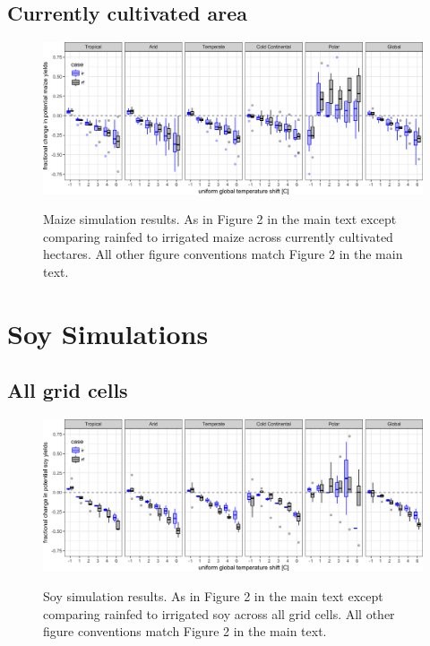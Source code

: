\documentclass[10pt]{article}
\begin{document}
\subsection{Currently cultivated area}
\begin{figure}[h!]
\includegraphics[width=\textwidth]{s_maize_sim_CG_area_weight.png}\\
\caption{Maize simulation results. As in Figure 2 in the main text except comparing rainfed to irrigated maize across currently cultivated hectares. All other figure conventions match Figure 2 in the main text.}
\label{fig:maizeCG}
\end{figure}

\clearpage
\section{Soy Simulations}
\subsection{All grid cells}
\begin{figure}[h!]
\includegraphics[width=\textwidth]{s_soy_sim_CG.png}\\
\caption{Soy simulation results. As in Figure 2 in the main text except comparing rainfed to irrigated soy across all grid cells. All other figure conventions match Figure 2 in the main text.}
\label{fig:maizeCG}
\end{figure}
\end{document}

